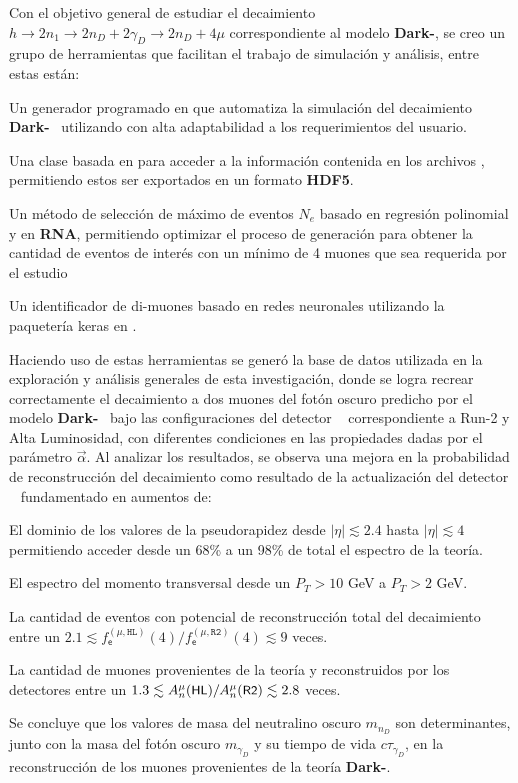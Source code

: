 Con el objetivo general de estudiar el decaimiento $h \rightarrow 2n_1 \rightarrow 2n_D + 2\gamma_D \rightarrow 2n_D + 4\mu$ correspondiente al modelo \textbf{Dark-}\SUSY, se creo un grupo de herramientas que facilitan el trabajo de simulación y análisis, entre estas están:
\begin{itemize_f}
\item Un generador programado en  que automatiza la simulación del decaimiento \textbf{Dark-}\SUSY~ utilizando  con alta adaptabilidad a los requerimientos del usuario.
\item Una clase basada en  para acceder a la información contenida en los archivos , permitiendo estos ser exportados en un formato \textbf{HDF5}.
\item Un método de selección de máximo de eventos $N_e$ basado en regresión polinomial y en \textbf{RNA}, permitiendo optimizar el proceso de generación para obtener la cantidad de eventos de interés con un mínimo de 4 muones que sea requerida por el estudio 
\item Un identificador de di-muones basado en redes neuronales utilizando la paquetería \textsf{keras} en .
\end{itemize_f}
Haciendo uso de estas herramientas se generó la base de datos utilizada en la exploración y análisis generales de esta investigación, donde se logra recrear correctamente el decaimiento a dos muones del fotón oscuro predicho por el modelo \textbf{Dark-}\SUSY~ bajo las configuraciones del detector \CMS ~ correspondiente a Run-2 y Alta Luminosidad, con diferentes condiciones en las propiedades dadas por el parámetro $\vec{\alpha}$. Al analizar los resultados, se observa una mejora en la probabilidad de reconstrucción del decaimiento como resultado de la actualización del detector \CMS~%
fundamentado en aumentos de:
\begin{itemize_f}
\item El dominio de los valores de la pseudorapidez desde $|\eta|\lesssim 2.4$ hasta $|\eta|\lesssim 4$ permitiendo acceder desde un 68\% a un 98\% de total el espectro de la teoría.
\item El espectro del momento transversal desde un $P_T>10$ GeV a $P_T>2$ GeV.
\item La cantidad de eventos con potencial de reconstrucción total del decaimiento entre un $2.1 \lesssim f^{(\mu, \texttt{HL})}_\textsf{e} (4)/f^{(\mu, \texttt{R2})}_\textsf{e} (4) \lesssim 9$ veces.%
\item La cantidad de muones provenientes de la teoría y reconstruidos por los detectores entre un $1.3 \lesssim  A^{\mu}_n(\textsf{\small HL})/A^{\mu}_n(\textsf{\small R2}) \lesssim 2.8$ veces.
\end{itemize_f}
Se concluye que los valores de masa del neutralino oscuro $m_{n_D}$ son determinantes, junto con la masa del fotón oscuro $m_{\gamma_D}$ y su tiempo de vida $c\tau_{\gamma_D}$, en la reconstrucción de los muones provenientes de la teoría \textbf{Dark-}\SUSY.

